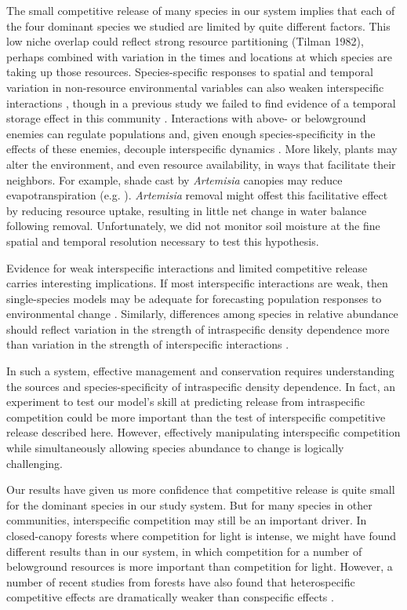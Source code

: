 \documentclass[11pt]{article}
\begin{document}
\begin{doublespacing}
The small competitive release of many species in our system implies that each of the four dominant species we studied are limited by quite different factors. This low niche overlap could reflect strong resource partitioning (Tilman 1982), perhaps combined with variation in the times and locations at which species are taking up those resources. Species-specific responses to spatial and temporal variation in non-resource environmental variables can also weaken interspecific interactions \citep{chesson_mechanisms_2000}, though in a previous study we failed to find evidence of a temporal storage effect in this community \citep{adler_weak_2009}. Interactions with above- or belowground enemies can regulate populations and, given enough species-specificity in the effects of these enemies, decouple interspecific dynamics \citep{hersh_evaluating_2011,janzen_herbivores_1970,connell_role_1971}.  More likely, plants may alter the environment, and even resource availability, in ways that facilitate their neighbors. For example, shade cast by \textit{Artemisia} canopies may reduce evapotranspiration (e.g. \citealt{Barbier2008}). \textit{Artemisia} removal might offest this facilitative effect by reducing resource uptake, resulting in little net change in water balance following removal.  Unfortunately, we did not monitor soil moisture at the fine spatial and temporal resolution necessary to test this hypothesis.

Evidence for weak interspecific interactions and limited competitive release carries interesting implications. If most interspecific interactions are weak, then single-species models may be adequate for forecasting population responses to environmental change \citep{adler_forecasting_2012,kleinhesselink_indirect_2015}. Similarly, differences among species in relative abundance should reflect variation in the strength of intraspecific density dependence more than variation in the strength of interspecific interactions \citep{yenni_strong_2012}. 

In such a system, effective management and conservation requires understanding the sources and species-specificity of intraspecific density dependence. In fact, an experiment to test our model's skill at predicting release from intraspecific competition could be more important than the test of interspecific competitive release described here. However, effectively manipulating interspecific competition while simultaneously allowing species abundance to change is logically challenging. 

Our results have given us more confidence that competitive release is quite small for the dominant species in our study system. But for many species in other communities, interspecific competition may still be an important driver. In closed-canopy forests where competition for light is intense, we might have found different results than in our system, in which competition for a number of belowground resources is more important than competition for light. However, a number of recent studies from forests have also found that heterospecific competitive effects are dramatically weaker than conspecific effects \citep{comita_asymmetric_2010,kunstler_plant_2015,johnson_conspecific_2012}. 


\end{doublespacing}
\end{document}
